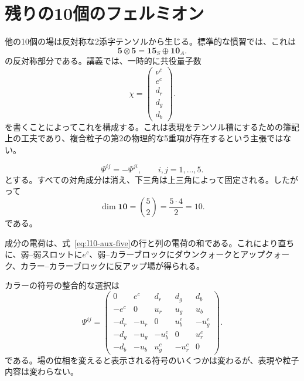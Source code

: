 \section{残りの10個のフェルミオン}

他の10個の場は反対称な2添字テンソルから生じる。標準的な慣習では、これは
\begin{equation}
\mathbf5\otimes\mathbf5
=\mathbf{15}_S\oplus\mathbf{10}_A.
\label{eq:l10-five-five}
\end{equation}
の反対称部分である。講義では、一時的に共役量子数
\begin{equation}
\chi=
\begin{pmatrix}
\nu^c\\
e^c\\
d_r\\
d_g\\
d_b
\end{pmatrix}.
\label{eq:l10-aux-five}
\end{equation}
を書くことによってこれを構成する。これは表現をテンソル積にするための簿記上の工夫であり、複合粒子の第2の物理的な5重項が存在するという主張ではない。


\begin{equation}
\Psi^{ij}=-\Psi^{ji},
\qquad
i,j=1,\ldots,5.
\label{eq:l10-antisym-ten}
\end{equation}
とする。すべての対角成分は消え、下三角は上三角によって固定される。したがって
\begin{equation}
\dim\mathbf{10}
=\binom52
=\frac{5\cdot4}{2}
=10.
\label{eq:l10-ten-count}
\end{equation}
である。

成分の電荷は、式~\eqref{eq:l10-aux-five}の行と列の電荷の和である。これにより直ちに、弱--弱スロットに\(e^c\)、弱--カラーブロックにダウンクォークとアップクォーク、カラー--カラーブロックに反アップ場が得られる。

\begin{classroomqa}
\end{classroomqa}

カラーの符号の整合的な選択は
\begin{equation}
\Psi^{ij}=
\begin{pmatrix}
0 & e^c & d_r & d_g & d_b\\
-e^c & 0 & u_r & u_g & u_b\\
-d_r & -u_r & 0 & u_b^c & -u_g^c\\
-d_g & -u_g & -u_b^c & 0 & u_r^c\\
-d_b & -u_b & u_g^c & -u_r^c & 0
\end{pmatrix}.
\label{eq:l10-ten-matrix}
\end{equation}
である。場の位相を変えると表示される符号のいくつかは変わるが、表現や粒子内容は変わらない。

